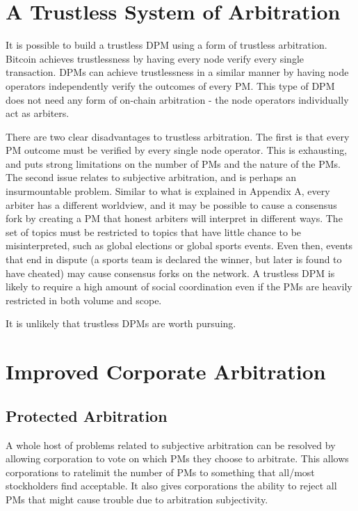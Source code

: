 \documentclass[onecolumn]{article}
\begin{document}
\section{A Trustless System of Arbitration}
It is possible to build a trustless DPM using a form of trustless arbitration.
Bitcoin achieves trustlessness by having every node verify every single transaction.
DPMs can achieve trustlessness in a similar manner by having node operators independently verify the outcomes of every PM.
This type of DPM does not need any form of on-chain arbitration - the node operators individually act as arbiters.

There are two clear disadvantages to trustless arbitration.
The first is that every PM outcome must be verified by every single node operator.
This is exhausting, and puts strong limitations on the number of PMs and the nature of the PMs.
The second issue relates to subjective arbitration, and is perhaps an insurmountable problem.
Similar to what is explained in Appendix A, every arbiter has a different worldview, and it may be possible to cause a consensus fork by creating a PM that honest arbiters will interpret in different ways.
The set of topics must be restricted to topics that have little chance to be misinterpreted, such as global elections or global sports events.
Even then, events that end in dispute (a sports team is declared the winner, but later is found to have cheated) may cause consensus forks on the network.
A trustless DPM is likely to require a high amount of social coordination even if the PMs are heavily restricted in both volume and scope.

It is unlikely that trustless DPMs are worth pursuing.

\section{Improved Corporate Arbitration}

\subsection{Protected Arbitration}
A whole host of problems related to subjective arbitration can be resolved by allowing corporation to vote on which PMs they choose to arbitrate.
This allows corporations to ratelimit the number of PMs to something that all/most stockholders find acceptable.
It also gives corporations the ability to reject all PMs that might cause trouble due to arbitration subjectivity.
\end{document}
